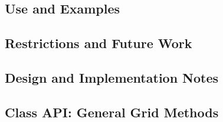 \documentclass[english]{article}
\begin{document}
\subsection{Use and Examples}


%
%
%
%
\subsection{Restrictions and Future Work}

\subsection{Design and Implementation Notes}

\subsection{Class API: General Grid Methods}

%
%
\end{document}
